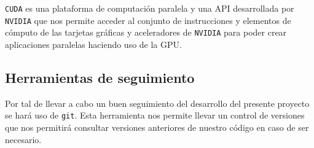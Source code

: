 \documentclass[titlepage,12pt]{report}
\begin{document}
\texttt{CUDA} es una plataforma de computación paralela y una API desarrollada por \texttt{NVIDIA} que nos permite acceder al conjunto de instrucciones y elementos de cómputo de las tarjetas gráficas y aceleradores de \texttt{NVIDIA} para poder crear aplicaciones paralelas haciendo uso de la GPU.

\subsection{Herramientas de seguimiento}

Por tal de llevar a cabo un buen seguimiento del desarrollo del presente proyecto se hará uso de \texttt{git}. Esta herramienta nos permite llevar un control de versiones que nos permitirá consultar versiones anteriores de nuestro código en caso de ser necesario.

\newpage
\nocite{*}


\end{document}
